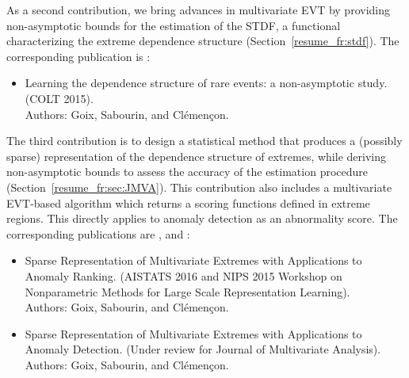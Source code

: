 


As a second contribution, we bring advances in multivariate EVT by providing non-asymptotic bounds for the estimation of the STDF, a functional characterizing the extreme dependence structure (Section~\ref{resume_fr:stdf}). The corresponding publication is \cite{COLT15}:
\begin{itemize}
\item Learning the dependence structure of rare events: a non-asymptotic study. (COLT 2015).\\
Authors: Goix, Sabourin, and Clémençon.
\end{itemize}

The third contribution is to design a statistical method that produces a (possibly sparse) representation of the dependence structure of extremes, while deriving non-asymptotic bounds to assess the accuracy of the estimation procedure (Section~\ref{resume_fr:sec:JMVA}).
%
This contribution also includes a multivariate EVT-based algorithm which returns a scoring functions defined in extreme regions. This directly applies to anomaly detection as an abnormality score.
The corresponding publications are \cite{AISTAT16}, \cite{NIPSWORKSHOP15} and \cite{ARXIV16}:
%
\begin{itemize}
\item Sparse Representation of Multivariate Extremes with Applications to Anomaly Ranking. (AISTATS 2016 and NIPS 2015 Workshop on Nonparametric Methods for Large Scale Representation Learning).\\
Authors: Goix, Sabourin, and Clémençon.
\item Sparse Representation of Multivariate Extremes with Applications to Anomaly Detection. (Under review for Journal of Multivariate Analysis).\\
Authors: Goix, Sabourin, and Clémençon.
\end{itemize}





